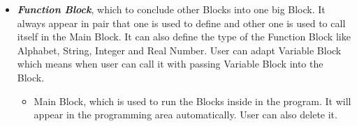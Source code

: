 \begin{itemize}
	\item \textit{\textbf{Function Block}}, which to conclude other Blocks into one big Block. It always appear in pair that one is used to define and other one is used to call itself in the Main Block. It can also define the type of the Function Block like Alphabet, String, Integer and Real Number. User can adapt Variable Block which means when user can call it with passing Variable Block into the Block.
	\begin{itemize}
		\item Main Block, which is used to run the Blocks inside in the program. It will appear in the programming area automatically. User can also delete it.
	\end{itemize}
	\end{itemize}
